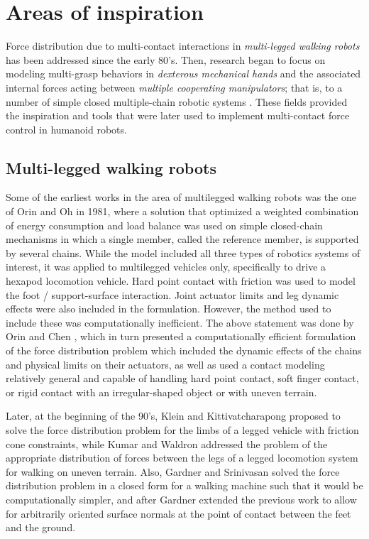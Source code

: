 \section{Areas of inspiration}
	\label{sec:inspiration}
	
	Force distribution due to multi-contact interactions in \emph{multi-legged walking robots} has been
	addressed since the early 80's.
	Then, research began to focus on modeling multi-grasp behaviors in \emph{dexterous mechanical hands}
	and the associated internal forces acting between \emph{multiple cooperating manipulators};
	that is, to a number of simple closed	multiple-chain robotic systems \cite{Orin_AdvRobotics1989}
	\cite{Nahon_TransRoboticsAuto1992} \cite{Chen_MIRC1999} \cite{Sentis_TransRobotics2010}.
	These fields provided the inspiration and tools that were later used to implement	multi-contact force
	control in humanoid robots.
	
	\subsection{Multi-legged walking robots}
		\label{sub:walking_robots}
		
		Some of the earliest works in the area of multilegged walking robots was the one of Orin and Oh
		\cite{Orin_DSMC1981} in 1981, where a solution that	optimized a weighted combination of energy
		consumption and load balance was used on simple closed-chain mechanisms in which a single member,
		called the reference member, is supported by several chains.
		While the model included all three types of robotics systems of interest, it was applied to	multilegged
		vehicles only, specifically to drive a hexapod locomotion vehicle.
		Hard point contact with friction was used to model the foot / support-surface interaction.
		Joint actuator limits and leg dynamic effects were also included in the formulation.
		However, the method used to include these was computationally inefficient.
		The above statement was done by Orin and Chen \cite{Orin_AdvRobotics1989}, which in turn presented a
		computationally efficient formulation of the force distribution problem which included the dynamic
		effects of the chains and physical limits on their actuators, as well as used a contact
		modeling relatively general and capable of handling hard point contact, soft finger contact,
		or rigid contact with an irregular-shaped	object or with uneven terrain.
		
		Later, at the beginning of the 90's, Klein and Kittivatcharapong \cite{Klein_RoboticsAuto1990}
		proposed to solve the force distribution problem for the limbs of a legged vehicle with friction
		cone constraints, while Kumar and Waldron \cite{Kumar_MechDesign1990} addressed the problem of the
		appropriate distribution of forces between the legs of a legged locomotion system for walking
		on uneven terrain.
		Also, Gardner and Srinivasan \cite{Gardner_DSMC1990} solved the force distribution
		problem in a closed form for a walking machine such that it would be computationally simpler,
		and after Gardner \cite{Gardner_DSMC1991} extended the previous work to allow for
		arbitrarily oriented surface normals at the point of contact between the feet and the ground.
		
